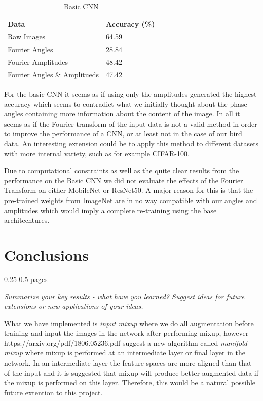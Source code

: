 \documentclass{article}
\begin{document}
\begin{table}[H]
  \caption{Basic CNN}
  \label{sample-table}
  \centering
  \begin{tabular}{ll}
    \toprule
    Data & Accuracy (\%) \\
    \midrule
    Raw Images  & 64.59 \\
    Fourier Angles & 28.84   \\
    Fourier Amplitudes & 48.42 \\
    Fourier Angles \& Amplitueds & 47.42 \\
    \bottomrule
  \end{tabular}
\end{table}

For the basic CNN it seems as if using only the amplitudes generated the highest accuracy which seems to contradict what we initially thought about the phase angles containing more information about the content of the image. In all it seems as if the Fourier transform of the input data is not a valid method in order to improve the performance of a CNN, or at least not in the case of our bird data. An interesting extension could be to apply this method to different datasets with more internal variety, such as for example CIFAR-100. 

\medskip

Due to computational constraints as well as the quite clear results from the performance on the Basic CNN we did not evaluate the effects of the Fourier Transform on either MobileNet or ResNet50. A major reason for this is that the pre-trained weights from ImageNet are in no way compatible with our angles and amplitudes which would imply a complete re-training using the base architechtures.

\section{Conclusions}

0.25-0.5 pages

\textit{Summarize your key results - what have you learned? Suggest ideas for future extensions or new applications of your ideas.}

What we have implemented is \textit{input mixup} where we do all augmentation before training and input the images in the network after performing mixup, however https://arxiv.org/pdf/1806.05236.pdf 
suggest a new algorithm called \textit{manifold mixup} where mixup is performed at an intermediate layer or final layer in the network. In an intermediate layer 
the feature spaces are more aligned than that of the input and it is suggested that mixup will produce better augmented data if the mixup is performed on this layer. Therefore, this would be 
a natural possible future extention to this project. 
\end{document}
